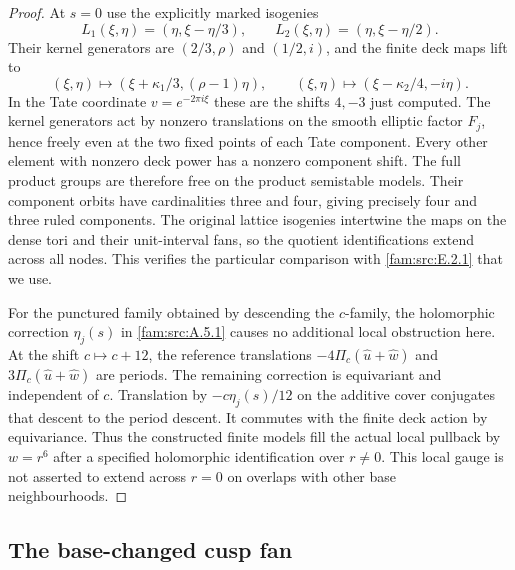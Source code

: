 \begin{proof}
At $s=0$ use the explicitly marked isogenies
\[
 L_1(\xi,\eta)=(\eta,\xi-\eta/3),\qquad
 L_2(\xi,\eta)=(\eta,\xi-\eta/2).
\]
Their kernel generators are $(2/3,\rho)$ and $(1/2,i)$,
and the finite deck maps lift to
\[
 (\xi,\eta)\mapsto(\xi+\kappa_1/3,(\rho-1)\eta),
 \qquad
 (\xi,\eta)\mapsto(\xi-\kappa_2/4,-i\eta).
\]
In the Tate coordinate $v=e^{-2\pi i\xi}$ these are the
shifts $4,-3$ just computed. The kernel generators act
by nonzero translations on the smooth elliptic factor
$F_j$, hence freely even at the two fixed points of each
Tate component. Every other element with nonzero deck
power has a nonzero component shift. The full product
groups are therefore free on the product semistable
models. Their component orbits have cardinalities three
and four, giving precisely four and three ruled
components. The original lattice isogenies intertwine
the maps on the dense tori and their unit-interval fans,
so the quotient identifications extend across all nodes.
This verifies the particular comparison with \cref{fam:src:E.2.1} that
we use.

For the punctured family obtained by descending the
$c$-family, the holomorphic correction $\eta_j(s)$ in
\cref{fam:src:A.5.1} causes no additional local obstruction here. At the
shift $c\mapsto c+12$, the reference translations
$-4\Pi_c(\widehat u+\widehat w)$ and
$3\Pi_c(\widehat u+\widehat w)$ are periods.
The remaining correction is equivariant and independent
of $c$. Translation by $-c\eta_j(s)/12$ on the additive
cover conjugates that descent to the period descent.
It commutes with the finite deck action by equivariance.
Thus the constructed finite models fill the actual local
pullback by $w=r^6$ after a specified holomorphic
identification over $r\ne0$. This local gauge is not
asserted to extend across $r=0$ on overlaps with other
base neighbourhoods.
\end{proof}

\subsection{The base-changed cusp fan}\label{push:section:B.2}

